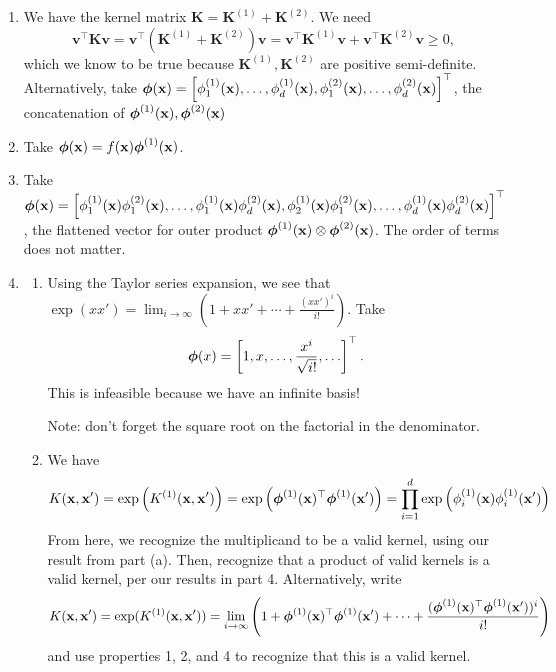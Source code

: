 \documentclass[11pt,letterpaper]{article}
\begin{document}
\begin{enumerate}
\begin{solution}
\begin{enumerate}
      \item We have the kernel matrix $\mathbf{K} = \mathbf{K}^{(1)} + \mathbf{K}^{(2)}$. We need 
      $$\mathbf{v}^\top \mathbf{K} \mathbf{v} = \mathbf{v}^\top(\mathbf{K}^{(1)} + \mathbf{K}^{(2)})\mathbf{v} = \mathbf{v}^\top\mathbf{K}^{(1)}\mathbf{v} + \mathbf{v}^\top\mathbf{K}^{(2)}\mathbf{v} \geq 0,$$
      which we know to be true because $\mathbf{K}^{(1)}, \mathbf{K}^{(2)}$ are positive semi-definite.\\
      Alternatively, take $\boldsymbol{\phi}(\mathbf{x}) = \left[\phi_1^{(1)}(\mathbf{x}), \hdots, \phi_d^{(1)}(\mathbf{x}), \phi_1^{(2)}(\mathbf{x}), \hdots, \phi_d^{(2)}(\mathbf{x})\right]^\top$, the concatenation of $\boldsymbol{\phi}^{(1)}(\mathbf{x}), \boldsymbol{\phi}^{(2)}(\mathbf{x})$

      \item Take $\boldsymbol{\phi}(\mathbf{x}) = f(\mathbf{x})\boldsymbol{\phi}^{(1)}(\mathbf{x})$.

      \item Take $\boldsymbol{\phi}(\mathbf{x}) = \left[\phi_1^{(1)}(\mathbf{x})\phi_1^{(2)}(\mathbf{x}), \hdots, \phi_1^{(1)}(\mathbf{x})\phi_d^{(2)}(\mathbf{x}), \phi_2^{(1)}(\mathbf{x})\phi_1^{(2)}(\mathbf{x}), \hdots, \phi_d^{(1)}(\mathbf{x})\phi_d^{(2)}(\mathbf{x}) \right]^\top$, the flattened vector for outer product $\boldsymbol{\phi}^{(1)}(\mathbf{x}) \otimes \boldsymbol{\phi}^{(2)}(\mathbf{x})$. The order of terms does not matter.

      \item \begin{enumerate}
        \item Using the Taylor series expansion, we see that $\exp(xx') = \lim_{i\rightarrow \infty} \left(1 + xx' + \cdots + \frac{(xx')^i}{i!}\right)$. Take 
        $$\boldsymbol{\phi}(x) = \left[1, x, \hdots, \frac{x^i}{\sqrt{i!}}, \hdots \right]^\top.$$
        This is infeasible because we have an infinite basis!

        Note: don't forget the square root on the factorial in the denominator.
        \item We have
        $$K(\mathbf{x}, \mathbf{x}') = \exp\left( K^{(1)}(\mathbf{x}, \mathbf{x}') \right) = \exp\left(\boldsymbol{\phi}^{(1)}(\mathbf{x})^\top \boldsymbol{\phi}^{(1)}(\mathbf{x}')\right) = \prod_{i=1}^d \exp\left(\phi_i^{(1)}(\mathbf{x}) \phi_i^{(1)}(\mathbf{x}')\right)$$
        From here, we recognize the multiplicand to be a valid kernel, using our result from part (a). Then, recognize that a product of valid kernels is a valid kernel, per our results in part 4. Alternatively, write
        $$K(\mathbf{x}, \mathbf{x}') = \exp(K^{(1)}(\mathbf{x}, \mathbf{x}')) = \lim_{i\rightarrow \infty} \left(1 + \boldsymbol{\phi}^{(1)}(\mathbf{x})^\top\boldsymbol{\phi}^{(1)}(\mathbf{x}') + \cdots + \frac{(\boldsymbol{\phi}^{(1)}(\mathbf{x})^\top\boldsymbol{\phi}^{(1)}(\mathbf{x}'))^i}{i!}\right)$$
        and use properties 1, 2, and 4 to recognize that this is a valid kernel.
      \end{enumerate}


\end{enumerate}
\end{solution}
\end{enumerate}
\end{document}
